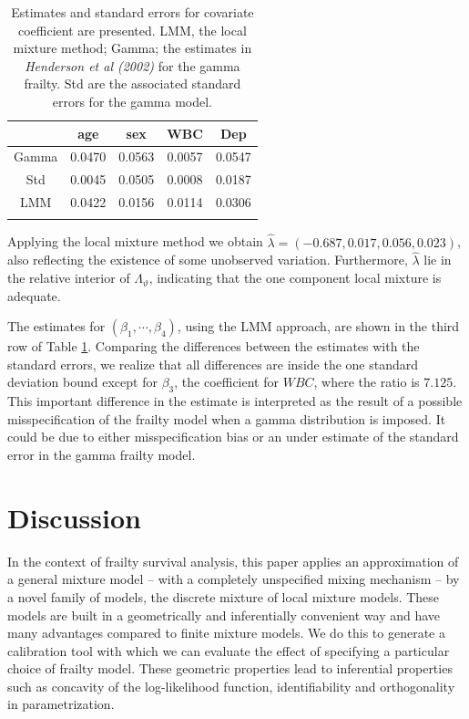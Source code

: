 \documentclass[graybox]{svmult}
\begin{document}
\begin{table}
\caption{Estimates and standard errors for covariate coefficient are presented. LMM, the local mixture method; Gamma;
the estimates in \emph{Henderson et al (2002)} for the gamma frailty. Std are the associated standard errors for the gamma model.}
\label{DataExample}
\begin{center}
\begin{tabular}{c c c c c}
\hline
   &  age & sex & WBC & Dep \\ [0.3ex]
\hline
Gamma  & 0.0470 & 0.0563 & 0.0057 & 0.0547 \\
Std  & 0.0045 & 0.0505 & 0.0008 & 0.0187 \\ \hline
LMM  & 0.0422 & 0.0156 & 0.0114 & 0.0306 \\
\hline\\
\end{tabular}
\end{center}
\end{table}

Applying the local mixture method we obtain $\hat{\lambda}=(-0.687,0.017,0.056,0.023)$, also  reflecting  the existence
of some unobserved variation. Furthermore, $\hat{\lambda}$ lie in the relative interior of $\Lambda_\vartheta$, indicating that the  one component local mixture is adequate. 

The estimates for  $(\beta_1,\cdots,\beta_4)$, using the LMM approach, are shown in the third row of Table \ref{DataExample}. 
 Comparing the differences between the
estimates with the standard errors, we realize that all differences are inside the one standard deviation bound
except for $\beta_3$, the coefficient for $WBC$, where the ratio is $7.125$. This important difference in the estimate
is interpreted as the result of a possible misspecification of the frailty model when a gamma distribution is imposed. It could be due to either misspecification bias or an under estimate of the standard error in the gamma frailty model.



\section{Discussion}\label{Summary}
In the context of  frailty survival analysis, this paper applies an approximation of a general mixture model -- with a completely unspecified mixing mechanism  -- by a
novel family of models, the discrete mixture of local mixture models.
These models are built in a geometrically and inferentially convenient way and have many advantages compared to 
finite mixture models. We do this to generate a calibration tool with which we can evaluate the effect of specifying a particular choice of frailty model. These geometric properties lead to inferential
properties such as concavity of the log-likelihood function, identifiability and orthogonality in parametrization.
\end{document}
